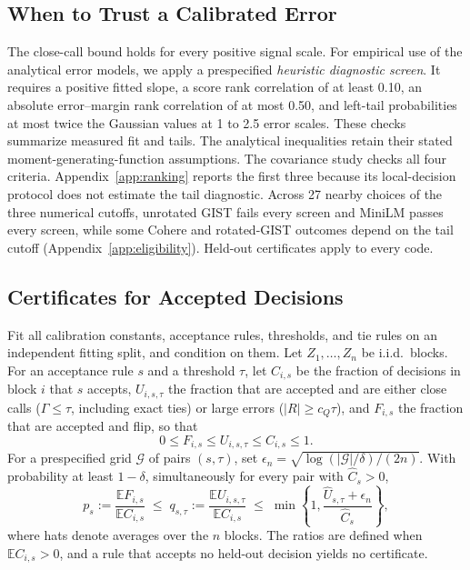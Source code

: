 \documentclass[twoside,11pt]{article}
\newcommand{\E}{\mathbb{E}}
\begin{document}
\subsection{When to Trust a Calibrated Error}
\label{sec:applicability}

The close-call bound holds for every positive signal scale. For empirical use of the analytical error models, we apply a prespecified \emph{heuristic diagnostic screen}. It requires a positive fitted slope, a score rank correlation of at least 0.10, an absolute error--margin rank correlation of at most 0.50, and left-tail probabilities at most twice the Gaussian values at 1 to 2.5 error scales. These checks summarize measured fit and tails. The analytical inequalities retain their stated moment-generating-function assumptions. The covariance study checks all four criteria. Appendix~\ref{app:ranking} reports the first three because its local-decision protocol does not estimate the tail diagnostic. Across 27 nearby choices of the three numerical cutoffs, unrotated GIST fails every screen and MiniLM passes every screen, while some Cohere and rotated-GIST outcomes depend on the tail cutoff (Appendix~\ref{app:eligibility}). Held-out certificates apply to every code.

\subsection{Certificates for Accepted Decisions}
\label{sec:certificates}

\begin{theorem}
\label{thm:heldout}
Fit all calibration constants, acceptance rules, thresholds, and tie rules on an independent fitting split, and condition on them. Let $Z_1,\ldots,Z_n$ be i.i.d.\ blocks. For an acceptance rule $s$ and a threshold $\tau$, let $C_{i,s}$ be the fraction of decisions in block $i$ that $s$ accepts, $U_{i,s,\tau}$ the fraction that are accepted and are either close calls ($\Gamma\le\tau$, including exact ties) or large errors ($|R|\ge c_Q\tau$), and $F_{i,s}$ the fraction that are accepted and flip, so that
\begin{equation}
0\le F_{i,s}\le U_{i,s,\tau}\le C_{i,s}\le1.
\end{equation}
For a prespecified grid $\mathcal G$ of pairs $(s,\tau)$, set $\epsilon_n=\sqrt{\log(|\mathcal G|/\delta)/(2n)}$. With probability at least $1-\delta$, simultaneously for every pair with $\widehat C_s>0$,
\begin{equation}
p_s:=\frac{\E F_{i,s}}{\E C_{i,s}}
\;\le\;
q_{s,\tau}:=\frac{\E U_{i,s,\tau}}{\E C_{i,s}}
\;\le\;
\min\!\left\{1,\frac{\widehat U_{s,\tau}+\epsilon_n}{\widehat C_s}\right\},
\label{eq:certificate}
\end{equation}
where hats denote averages over the $n$ blocks. The ratios are defined when $\E C_{i,s}>0$, and a rule that accepts no held-out decision yields no certificate.
\end{theorem}
\end{document}
